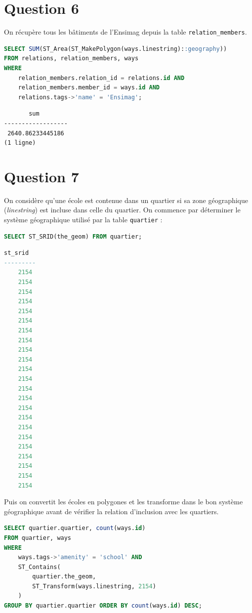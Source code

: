 \documentclass[12pt,a4paper]{article}
\begin{document}
\vspace{1cm}
\section*{Question 6}

On récupère tous les bâtiments de l'Ensimag depuis la table \verb?relation_members?.

\begin{lstlisting}[language=SQL]
SELECT SUM(ST_Area(ST_MakePolygon(ways.linestring)::geography))
FROM relations, relation_members, ways
WHERE
	relation_members.relation_id = relations.id AND
	relation_members.member_id = ways.id AND
	relations.tags->'name' = 'Ensimag';
\end{lstlisting}

\begin{lstlisting}
       sum
------------------
 2640.86233445186
(1 ligne)
\end{lstlisting}

\vspace{1cm}
\section*{Question 7}

On considère qu'une école est contenue dans un quartier si sa zone géographique (\textit{linestring})
est incluse dans celle du quartier. On commence par déterminer le système
géographique utilisé par la table \verb?quartier? :

\begin{lstlisting}[language=SQL]
SELECT ST_SRID(the_geom) FROM quartier;
\end{lstlisting}

\begin{lstlisting}[language=SQL]
st_srid 
---------
    2154
    2154
    2154
    2154
    2154
    2154
    2154
    2154
    2154
    2154
    2154
    2154
    2154
    2154
    2154
    2154
    2154
    2154
    2154
    2154
    2154
    2154
    2154
\end{lstlisting}

Puis on convertit les écoles en polygones et les transforme dans le bon système géographique avant de vérifier la relation d'inclusion avec les quartiers.

\begin{lstlisting}[language=SQL]
SELECT quartier.quartier, count(ways.id)
FROM quartier, ways
WHERE
    ways.tags->'amenity' = 'school' AND
    ST_Contains(
        quartier.the_geom,
        ST_Transform(ways.linestring, 2154)
    )
GROUP BY quartier.quartier ORDER BY count(ways.id) DESC;
\end{lstlisting}
\end{document}
